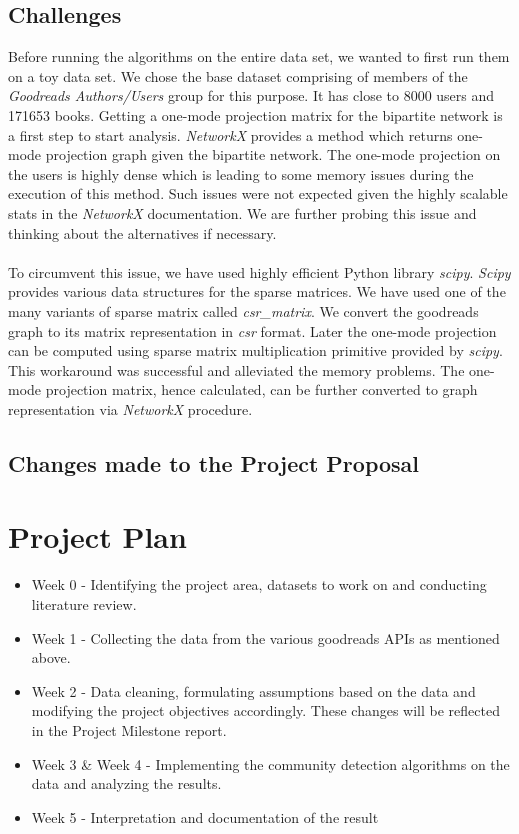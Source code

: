 \documentclass[11pt]{article}
\begin{document}
\subsection{Challenges}
Before running the algorithms on the entire data set, we wanted to first run them on a toy data set. We chose the  base dataset comprising of members of the {\it Goodreads Authors/Users} group for this purpose. It has close to 8000 users and 171653 books. Getting a one-mode projection matrix for the bipartite network is a first step to start analysis. {\it NetworkX} provides a method which returns one-mode projection graph given the bipartite network. The one-mode projection on the users is highly dense which is leading to some memory issues during the execution of this method. Such issues were not expected given the highly  scalable stats in the {\it NetworkX} documentation. We are further probing this issue and thinking about the alternatives if necessary. \\\\
To circumvent this issue, we have used highly efficient Python library {\it scipy}. {\it Scipy} provides various data structures for the sparse matrices. We have used one of the many variants of sparse matrix called {\it csr\_matrix}. We convert the goodreads graph to its matrix representation in {\it csr} format. Later the one-mode projection can be computed using sparse matrix multiplication primitive provided by {\it scipy}. This workaround was successful and alleviated the memory problems. The one-mode projection matrix, hence calculated, can be further converted to graph representation via {\it NetworkX} procedure.
\subsection{Changes made to the Project Proposal}
\section{Project Plan}
\begin{itemize}
\item Week 0 - Identifying the project area, datasets to work on and conducting literature review. \checkmark
\item Week 1 -  Collecting the data from the various goodreads APIs as mentioned above. \checkmark
\item Week 2 -  Data cleaning, formulating assumptions based on the data and modifying the project objectives accordingly. These changes will be reflected in the Project Milestone report. \checkmark
\item Week 3 \& Week 4 - Implementing the community detection algorithms on the data and analyzing the results.
\item Week 5 - Interpretation and documentation of the result
\end{itemize}



\end{document}
